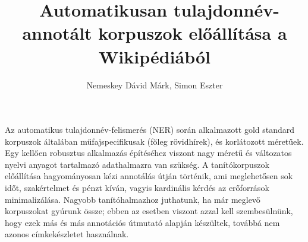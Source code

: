 \documentclass{llncs}
\begin{document}
\pagestyle{myheadings}
\def\leftmark{{\rm IX. Magyar Sz\'am\'\i t\'og\'epes Nyelv\'eszeti Konferencia}}
\def\rightmark{{\rm Szeged, 2013. január 7-8.}}

\setcounter{page}{3}

\title{\ \break Automatikusan tulajdonnév-annotált korpuszok előállítása a Wikipédiából}
\author{Nemeskey Dávid Márk, Simon Eszter}

\maketitle




Az automatikus tulajdonnév-felismerés (NER) során alkalmazott gold standard korpuszok általában műfajspecifikusak (főleg rövidhírek), és korlátozott méretűek. Egy kellően robusztus alkalmazás építéséhez viszont nagy méretű és változatos nyelvi anyagot tartalmazó adathalmazra van szükség. A tanítókorpuszok előállítása hagyományosan kézi annotálás útján történik, ami meglehetősen sok időt, szakértelmet és pénzt kíván, vagyis kardinális kérdés az erőforrások minimalizálása. Nagyobb tanítóhalmazhoz juthatunk, ha már meglevő korpuszokat gyúrunk össze; ebben az esetben viszont azzal kell szembesülnünk, hogy ezek más és más annotációs útmutató alapján készültek, továbbá nem azonos címkekészletet használnak. 
\end{document}
